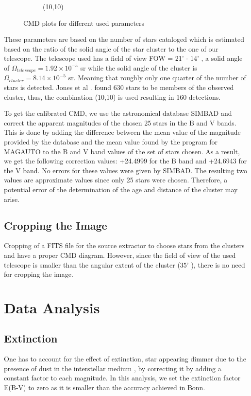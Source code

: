 \documentclass[12pt]{article}
\begin{document}
\begin{figure}[H]
\begin{subfigure}{.8\textwidth}
        \caption{(10,10)}
    \end{subfigure}
    \caption{CMD plots for different used parameters}
    \label{parameters}
\end{figure}

These parameters are based on the number of stars cataloged which is estimated based on the ratio of the solid angle of the star cluster to the one of our telescope. The telescope used has a field of view FOW = 21' $\cdot$ 14' \cite{telescope}, a solid angle of $\Omega_{telescope} = 1.92 \times 10^{-5}$ sr while the solid angle of the cluster is $\Omega_{cluster} = 8.14 \times 10^{-5}$ sr. Meaning that roughly only one quarter of the number of stars is detected. Jones et al \cite{jones}. found 630 stars to be members of the observed cluster, thus, the combination (10,10) is used resulting in 160 detections. 

To get the calibrated CMD, we use the astronomical database SIMBAD \cite{simbad} and correct the apparent magnitudes of the chosen 25 stars in the B and V bands. This is done by adding the difference between the mean value of the magnitude provided by the database and the mean value found by the program for MAG\textunderscore AUTO to the B and V band values of the set of stars chosen. As a result, we get the following correction values: +24.4999 for the B band and +24.6943 for the V band. No errors for these values were given by SIMBAD. The resulting two values are approximate values since only 25 stars were chosen. Therefore, a potential error of the determination of the age and distance of the cluster may arise. 

\subsection{Cropping the Image}
Cropping of a FITS file for the source extractor to choose stars from the clusters and have a proper CMD diagram. However, since the field of view of the used telescope is smaller than the angular extent of the cluster (35' \cite{m34}), there is no need for cropping the image. 

\section{Data Analysis}

\subsection{Extinction}
One has to account for the effect of extinction, star appearing dimmer due to the presence of dust in the interstellar medium \cite{lecturenote}, by correcting it by adding a constant factor to each magnitude. In this analysis, we set the extinction factor E(B-V) to zero as it is smaller than the accuracy achieved in Bonn. 
\end{document}
